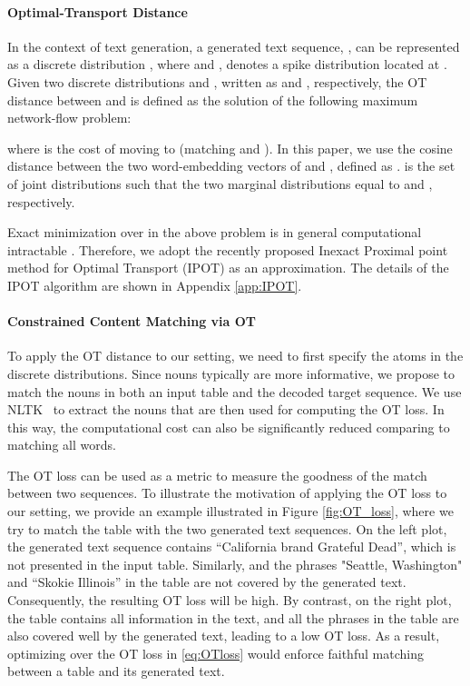 \documentclass[11pt,a4paper]{article}
\begin{document}
\paragraph{Optimal-Transport Distance}
In the context of text generation, a generated text sequence, , can be represented as a discrete distribution , where  and ,  denotes a spike distribution located at . Given two discrete distributions  and , written as  and , respectively, the OT distance between  and  is defined as the solution of the following maximum network-flow problem: 
\vspace{-0.3cm}
\par\vspace{-0.3cm}
\noindent where  is the cost of moving  to  (matching  and ). In this paper, we use the cosine distance between the two word-embedding vectors of  and , defined as .  is the set of joint distributions such that the two marginal distributions equal to  and , respectively.

Exact minimization over  in the above problem is in general computational
intractable \cite{Genevay2018}. Therefore, we adopt the recently proposed Inexact Proximal point method for Optimal Transport (IPOT) \cite{yujia2018} as an approximation. The details of the IPOT algorithm are shown in Appendix \ref{app:IPOT}.

\paragraph{Constrained Content Matching via OT}
To apply the OT distance to our setting, we need to first specify the atoms in the discrete distributions. Since nouns typically are more informative, we propose to match the nouns in both an input table and the decoded target sequence. We use NLTK~\cite{loper2002} to extract the nouns that are then used for computing the OT loss. In this way, the computational cost can also be significantly reduced comparing to matching all words. 

The OT loss can be used as a metric to measure the goodness of the match between two sequences. To illustrate the motivation of applying the OT loss to our setting, we provide an example illustrated in Figure \ref{fig:OT_loss}, where we try to match the table with the two generated text sequences. On the left plot, the generated text sequence contains ``California brand Grateful Dead'', which is not presented in the input table. Similarly, and the phrases "Seattle, Washington" and ``Skokie Illinois'' in the table are not covered by the generated text. Consequently, the resulting OT loss will be high. By contrast, on the right plot, the table contains all information in the text, and all the phrases in the table are also covered well by the generated text, leading to a low OT loss. As a result, optimizing over the OT loss in \eqref{eq:OTloss} would enforce faithful matching between a table and its generated text.
\end{document}
